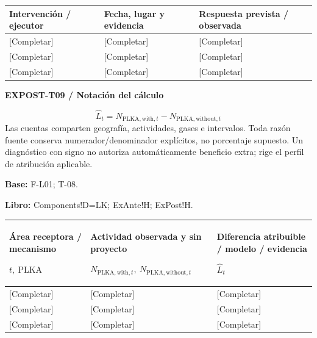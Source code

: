 {\sffamily\fontsize{8.3}{10.3}\selectfont\begin{longtable}{@{}P{54.83mm} P{54.83mm} P{54.83mm}@{}}
\toprule
\textbf{Intervención / ejecutor} & \textbf{Fecha, lugar y evidencia} & \textbf{Respuesta prevista / observada}\\\midrule\endhead
\rule{0pt}{8mm}[Completar] & [Completar] & [Completar]\\\hline
\rule{0pt}{8mm}[Completar] & [Completar] & [Completar]\\\hline
\rule{0pt}{8mm}[Completar] & [Completar] & [Completar]\\\hline
\end{longtable}}
\par\begingroup\sffamily\fontsize{8}{10}\selectfont\color{NEBGreen}\setlength{\parskip}{2pt}\setlength{\abovedisplayskip}{4pt}\setlength{\belowdisplayskip}{4pt}\setlength{\abovedisplayshortskip}{2pt}\setlength{\belowdisplayshortskip}{3pt}
\textbf{EXPOST-T09 / Notación del cálculo}\par
{\fontsize{9}{11}\selectfont\[ \widehat L_t=N_{\mathrm{PLKA,with},t}-N_{\mathrm{PLKA,without},t} \]}
Las cuentas comparten geografía, actividades, gases e intervalos. Toda razón fuente conserva numerador/denominador explícitos, no porcentaje supuesto. Un diagnóstico con signo no autoriza automáticamente beneficio extra; rige el perfil de atribución aplicable.\par
\textbf{Base:} F-L01; T-08.\par
\textbf{Libro:} Components!D=LK; ExAnte!H; ExPost!H.\par\endgroup
{\sffamily\fontsize{8.3}{10.3}\selectfont\begin{longtable}{@{}P{54.83mm} P{54.83mm} P{54.83mm}@{}}
\toprule
\textbf{Área receptora / mecanismo}\par {\normalfont\fontsize{8.2}{10}\selectfont $t,\ \mathrm{PLKA}$} & \textbf{Actividad observada y sin proyecto}\par {\normalfont\fontsize{8.2}{10}\selectfont $N_{\mathrm{PLKA,with},t},\ N_{\mathrm{PLKA,without},t}$} & \textbf{Diferencia atribuible / modelo / evidencia}\par {\normalfont\fontsize{8.2}{10}\selectfont $\widehat L_t$}\\\midrule\endhead
\rule{0pt}{8mm}[Completar] & [Completar] & [Completar]\\\hline
\rule{0pt}{8mm}[Completar] & [Completar] & [Completar]\\\hline
\rule{0pt}{8mm}[Completar] & [Completar] & [Completar]\\\hline
\end{longtable}}
